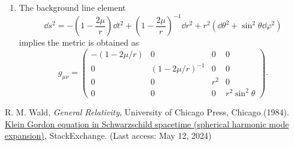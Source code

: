 \documentclass[a4paper,pdftex,10pt]{article}
\begin{document}
\maketitle

\begin{enumerate}
  \item 
  The background line element
  \begin{equation}
    \dd s^2
    =
    -
    \left( 1-\frac{2\mu}{r} \right)\dd t^2
    +
    \left( 1-\frac{2\mu}{r} \right)^{-1}\dd r^2
    +
    r^2
    (\dd\theta^2+\sin^2\theta\dd\varphi^2)
  \end{equation}
  implies the metric is obtained as
  \begin{equation}
    g_{\mu\nu}
    =
    \begin{pmatrix}
      -\left( 1-2\mu/r \right) & 0 & 0 & 0 \\
      0 & \left( 1-2\mu/r \right)^{-1} & 0 & 0 \\
      0 & 0 & r^2 & 0 \\
      0 & 0 & 0 & r^2\sin^2\theta
    \end{pmatrix}
    .
  \end{equation}

  












\end{enumerate}

\clearpage
\begin{thebibliography}{99}
  R. M. Wald, \textit{General Relativity}, University of Chicago Press, Chicago (1984).
  \href{https://physics.stackexchange.com/questions/313336/klein-gordon-equation-in-schwarzschild-spacetime-spherical-harmonic-mode-expans}{Klein Gordon equation in Schwarzschild spacetime (spherical harmonic mode expansion)}, StackExchange. (Last access: May 12, 2024)
\end{thebibliography}


% 
% 

\end{document}
